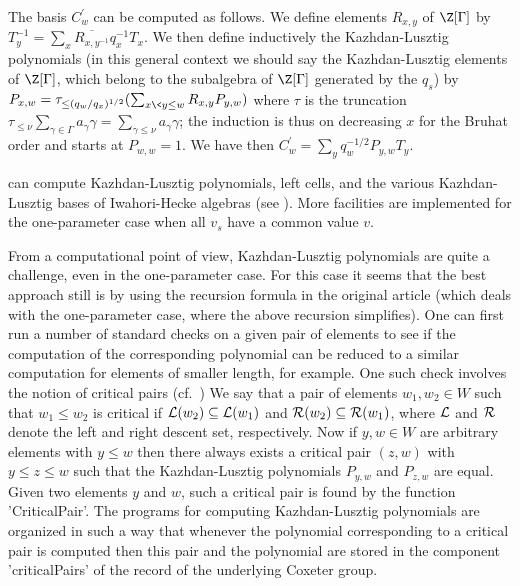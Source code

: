 The  basis  $C^\prime_w$  can  be  computed  as follows. We define elements
$R_{x,y}$   of  $\Z[\Gamma]$  by  $T_y^{-1}=\sum_x  \overline{R_{x,y^{-1}}}
q_x^{-1}T_x$.  We then  define inductively  the Kazhdan-Lusztig polynomials
(in  this general  context we  should say  the Kazhdan-Lusztig  elements of
$\Z[\Gamma]$,  which belong to the  subalgebra of $\Z[\Gamma]$ generated by
the    $q_s$)    by    $P_{x,w}=\tau_{\le(q_w/q_x)^{1/2}}    (\sum_{x\<y\le
w}R_{x,y}P_{y,w})$  where  $\tau$  is  the  truncation  \:\  $\tau_{\le\nu}
\sum_{\gamma\in\Gamma}  a_\gamma\gamma= \sum_{\gamma\le\nu}a_\gamma\gamma$;
the induction is thus on decreasing $x$ for the Bruhat order and starts at
$P_{w,w}=1$. We have then $C^\prime_w=\sum_y q_w^{-1/2} P_{y,w}T_y$.

{\CHEVIE}  can  compute  Kazhdan-Lusztig  polynomials,  left cells, and the
various  Kazhdan-Lusztig bases of Iwahori-Hecke algebras (see \cite{KL79}).
More  facilities are implemented for the  one-parameter case when all $v_s$
have a common value $v$.

From a computational point of view, Kazhdan-Lusztig polynomials are quite a
challenge,  even in the one-parameter case. For this case it seems that the
best  approach  still  is  by  using  the recursion formula in the original
article  \cite{KL79} (which  deals with  the one-parameter  case, where the
above  recursion simplifies). One can first run a number of standard checks
on  a given pair of elements to see if the computation of the corresponding
polynomial  can be reduced to a similar computation for elements of smaller
length,  for example. One such check  involves the notion of critical pairs
(cf.\  \cite{Alv87})\: We say that a pair of elements $w_1, w_2 \in W$ such
that  $w_1 \le w_2$ is critical  if ${\cal L}(w_2) \subseteq {\cal L}(w_1)$
and  ${\cal R}(w_2) \subseteq  {\cal R}(w_1)$, where  ${\cal L}$ and ${\cal
R}$ denote the left and right descent set, respectively. Now if $y,w \in W$
are  arbitrary elements with $y \le w$  then there always exists a critical
pair  $(z,w)$ with $y\le z\le w$  such that the Kazhdan-Lusztig polynomials
$P_{y,w}$  and $P_{z,w}$ are equal. Given two  elements $y$ and $w$, such a
critical  pair  is  found  by  the  function  'CriticalPair'. The {\CHEVIE}
programs  for computing Kazhdan-Lusztig polynomials are organized in such a
way  that  whenever  the  polynomial  corresponding  to  a critical pair is
computed  then this  pair and  the polynomial  are stored  in the component
'criticalPairs' of the record of the underlying Coxeter group.

